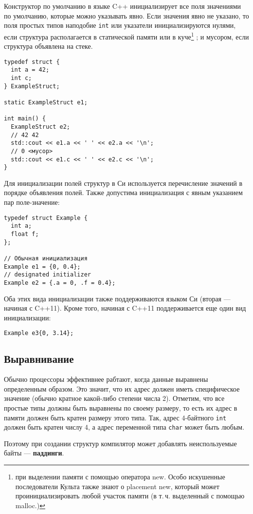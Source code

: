 \documentclass[14pt, a4paper]{extarticle}
\begin{document}
Конструктор по умолчанию в языке C++ инициализирует все поля значениями по
умолчанию, которые можно указывать явно. Если значения явно не указано, то
поля простых типов наподобие \verb|int| или указатели инициализируются нулями,
если структура располагается в статической памяти или в куче\footnote{при
выделении памяти с помощью оператора new. Особо искушенные последователи Культа
также знают о placement new, который может проинициализировать любой участок памяти (в
т.\,ч. выделенный с помощью malloc.)}
; и мусором, если
структура объявлена на стеке.
\begin{verbatim}
typedef struct {
  int a = 42;
  int c;
} ExampleStruct;

static ExampleStruct e1;

int main() {
  ExampleStruct e2;
  // 42 42
  std::cout << e1.a << ' ' << e2.a << '\n';
  // 0 <мусор>
  std::cout << e1.c << ' ' << e2.c << '\n';
}
\end{verbatim}

Для инициализации полей структур в Си используется перечисление значений
в порядке объявления полей. Также допустима инициализация с явным указанием
пар поле-значение:
\begin{verbatim}
typedef struct Example {
  int a;
  float f;
};

// Обычная инициализация
Example e1 = {0, 0.4};
// designated initializer
Example e2 = {.a = 0, .f = 0.4};
\end{verbatim}

Оба этих вида инициализации также поддерживаются языком Си (вторая --- начиная с C++11).
Кроме того, начиная с C++11 поддерживается еще один вид инициализации:
\begin{verbatim}
Example e3{0, 3.14};
\end{verbatim}

\subsection*{Выравнивание}
Обычно процессоры эффективнее рабтают, когда данные выравнены определенным образом.
Это значит, что их адрес должен иметь специфическое значение (обычно кратное
какой-либо степени числа 2). Отметим, что все простые типы должны быть выравнены
по своему размеру, то есть их адрес в памяти должен быть кратен размеру этого типа.
Так, адрес 4-байтного \verb|int| должен быть кратен числу 4, а адрес переменной типа
\verb|char| может быть любым.



Поэтому при создании структур компилятор может добавлять
неиспользуемые байты --- \textbf{паддинги}.
\end{document}

